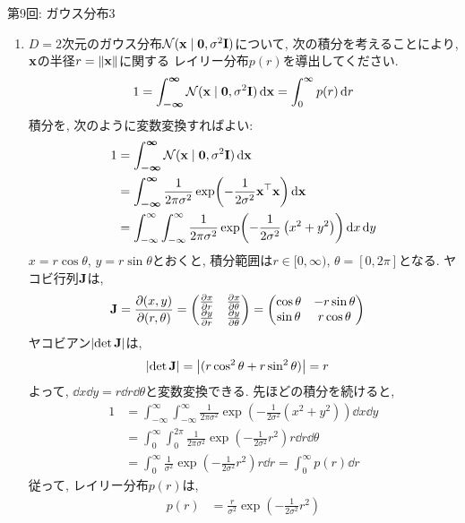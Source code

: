\documentclass[dvipdfmx,notheorems,t]{beamer}
\begin{document}
\begin{frame}{第9回: ガウス分布3}
\begin{enumerate}
  \item $D = 2$次元のガウス分布$\mathcal{N}(\vb{x} \mid \vb{0}, \sigma^2 \vb{I})$について,
  次の積分を考えることにより, $\vb{x}$の半径$r = \left\| \vb{x} \right\|$に関する
  レイリー分布$p(r)$を導出してください.
  \begin{align*}
    1 = \int_{\boldsymbol{-\infty}}^{\boldsymbol{\infty}}
      \mathcal{N}(\vb{x} \mid \vb{0}, \sigma^2 \vb{I}) \dd{\vb{x}}
      = \int_0^\infty p(r) \dd{r}
  \end{align*}
  積分を, 次のように変数変換すればよい:
  \begin{align*}
    1 &= \int_{\boldsymbol{-\infty}}^{\boldsymbol{\infty}}
      \mathcal{N}(\vb{x} \mid \vb{0}, \sigma^2 \vb{I}) \dd{\vb{x}} \\
      &= \int_{\boldsymbol{-\infty}}^{\boldsymbol{\infty}}
      \frac{1}{2\pi \sigma^2} \exp(-\frac{1}{2 \sigma^2} \vb{x}^\top \vb{x}) \dd{\vb{x}} \\
      &= \int_{-\infty}^\infty \int_{-\infty}^\infty
        \frac{1}{2\pi \sigma^2} \exp(-\frac{1}{2\sigma^2} \left( x^2 + y^2 \right)) \dd{x} \dd{y}
  \end{align*}
  $x = r \cos \theta$, $y = r \sin \theta$とおくと, 積分範囲は$r \in [0, \infty)$, $\theta = [0, 2\pi]$となる.
  ヤコビ行列$\vb{J}$は,
  \begin{align*}
    \vb{J} &= \pdv{(x, y)}{(r, \theta)}
      = \mqty(\pdv{x}{r} & \pdv{x}{\theta} \\ \pdv{y}{r} & \pdv{y}{\theta})
      = \mqty(\cos \theta & -r \sin \theta \\ \sin \theta & r \cos \theta)
  \end{align*}
  ヤコビアン$\left| \det \vb{J} \right|$は,
  \begin{align*}
    \left| \det \vb{J} \right| &= \left|
      (r \cos^2 \theta + r \sin^2 \theta) \right| = r
  \end{align*}
  よって, $\dd{x} \dd{y} = r \dd{r} \dd{\theta}$と変数変換できる.
  \newpage
  先ほどの積分を続けると,
  \begin{align*}
    1 &= \int_{-\infty}^\infty \int_{-\infty}^\infty
      \frac{1}{2\pi \sigma^2} \exp(-\frac{1}{2\sigma^2} \left( x^2 + y^2 \right)) \dd{x} \dd{y} \\
      &= \int_0^\infty \int_0^{2\pi}
      \frac{1}{2\pi \sigma^2} \exp(-\frac{1}{2\sigma^2} r^2) r \dd{r} \dd{\theta} \\
      &= \int_0^\infty \frac{1}{\sigma^2} \exp(-\frac{1}{2\sigma^2} r^2) r \dd{r}
      = \int_0^\infty p(r) \dd{r}
  \end{align*}
  従って, レイリー分布$p(r)$は,
  \begin{align*}
    p(r) &= \frac{r}{\sigma^2} \exp(-\frac{1}{2\sigma^2} r^2)
  \end{align*}
\end{enumerate}
\end{frame}
\end{document}
